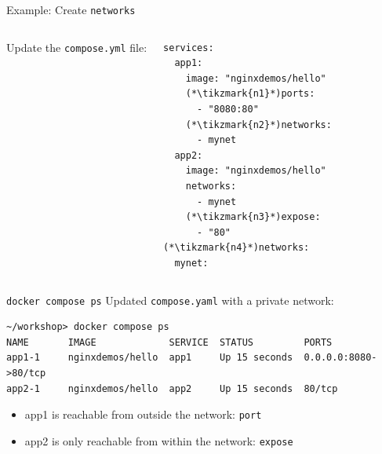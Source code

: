 \begin{frame}[fragile]{Example: Create \texttt{networks}}
  \begin{columns}[T]
      Update the \texttt{compose.yml} file:
      \begin{yamlbox}
\begin{lstlisting}[style=wsyamlstyle, basicstyle=\ttfamily\scriptsize]
services:
  app1:
    image: "nginxdemos/hello"
    (*\tikzmark{n1}*)ports:
      - "8080:80"
    (*\tikzmark{n2}*)networks:
      - mynet
  app2:
    image: "nginxdemos/hello"
    networks:
      - mynet
    (*\tikzmark{n3}*)expose:
      - "80"
(*\tikzmark{n4}*)networks:
  mynet:
\end{lstlisting}
      \end{yamlbox}
  \end{columns}
\end{frame}

\begin{frame}[fragile]{\texttt{docker compose ps}}
  Updated \texttt{compose.yaml} with a private network:
  \begin{termbox}
\begin{lstlisting}[style=wstermstyle, basicstyle=\ttfamily\scriptsize\color{wsgreen}]
~/workshop> docker compose ps
NAME       IMAGE             SERVICE  STATUS         PORTS
app1-1     nginxdemos/hello  app1     Up 15 seconds  0.0.0.0:8080->80/tcp
app2-1     nginxdemos/hello  app2     Up 15 seconds  80/tcp
\end{lstlisting}
  \end{termbox}
  \begin{itemize}
    \item app1 is reachable from outside the network: \texttt{port}
    \item app2 is only reachable from within the network: \texttt{expose}
  \end{itemize}
\end{frame}

